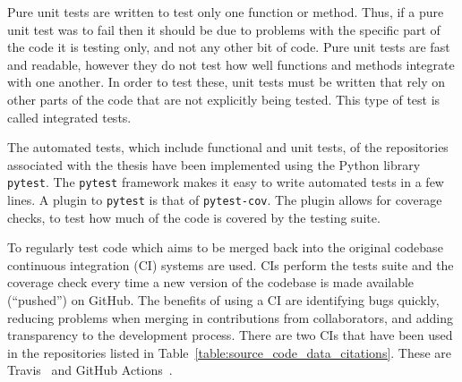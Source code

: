 Pure unit tests are written to test only one function or method. Thus, if a pure
unit test was to fail then it should be due to problems with the specific part
of the code it is testing only, and not any other bit of code. Pure unit tests
are fast and readable, however they do not test how well functions and methods
integrate with one another. In order to test these, unit tests must be written
that rely on other parts of the code that are not explicitly being tested. This
type of test is called integrated tests.

The automated tests, which include functional and unit tests, of the
repositories associated with the thesis have been implemented using the Python
library \texttt{pytest}. The \texttt{pytest} framework
makes it easy to write automated tests in a few lines. A plugin to
\texttt{pytest} is that of \texttt{pytest-cov}. The plugin
allows for coverage checks, to test how much of the code is covered by the testing
suite.

To regularly test code which aims to be merged back into the original codebase
continuous integration (CI) systems are used. CIs perform the tests suite and
the coverage check every time a new version of the codebase is made available
(``pushed'') on GitHub. The benefits of using a CI are identifying bugs quickly,
reducing problems when merging in contributions from collaborators, and adding
transparency to the development process. There are two CIs that have been used
in the repositories listed in Table~\ref{table:source_code_data_citations}.
These are Travis~\cite{travis} and GitHub Actions~\cite{github_actions}.




